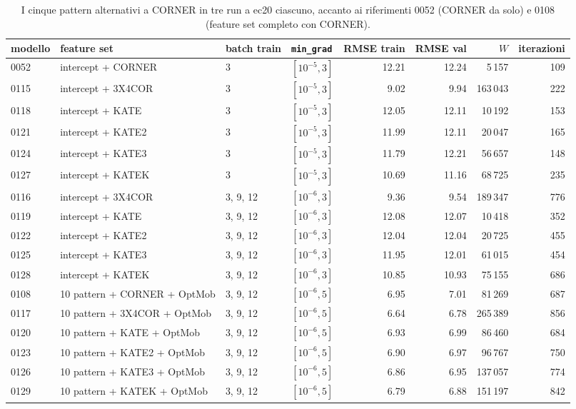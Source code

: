 \begin{table}[ht]
\centering
\small
\begin{tabular}{llllrrrr}
\toprule
modello & feature set & batch train & \texttt{min\_grad} & RMSE train & RMSE val & $W$ & iterazioni \\
\midrule
0052 & intercept + CORNER & 3 & $[10^{-5}, 3]$ & 12.21 & 12.24 & 5\,157 & 109 \\
0115 & intercept + 3X4COR & 3 & $[10^{-5}, 3]$ & 9.02 & 9.94 & 163\,043 & 222 \\
0118 & intercept + KATE & 3 & $[10^{-5}, 3]$ & 12.05 & 12.11 & 10\,192 & 153 \\
0121 & intercept + KATE2 & 3 & $[10^{-5}, 3]$ & 11.99 & 12.11 & 20\,047 & 165 \\
0124 & intercept + KATE3 & 3 & $[10^{-5}, 3]$ & 11.79 & 12.21 & 56\,657 & 148 \\
0127 & intercept + KATEK & 3 & $[10^{-5}, 3]$ & 10.69 & 11.16 & 68\,725 & 235 \\
0116 & intercept + 3X4COR & 3, 9, 12 & $[10^{-6}, 3]$ & 9.36 & 9.54 & 189\,347 & 776 \\
0119 & intercept + KATE & 3, 9, 12 & $[10^{-6}, 3]$ & 12.08 & 12.07 & 10\,418 & 352 \\
0122 & intercept + KATE2 & 3, 9, 12 & $[10^{-6}, 3]$ & 12.04 & 12.04 & 20\,725 & 455 \\
0125 & intercept + KATE3 & 3, 9, 12 & $[10^{-6}, 3]$ & 11.95 & 12.01 & 61\,015 & 454 \\
0128 & intercept + KATEK & 3, 9, 12 & $[10^{-6}, 3]$ & 10.85 & 10.93 & 75\,155 & 686 \\
0108 & 10 pattern + CORNER + OptMob & 3, 9, 12 & $[10^{-6}, 5]$ & 6.95 & 7.01 & 81\,269 & 687 \\
0117 & 10 pattern + 3X4COR + OptMob & 3, 9, 12 & $[10^{-6}, 5]$ & 6.64 & 6.78 & 265\,389 & 856 \\
0120 & 10 pattern + KATE + OptMob & 3, 9, 12 & $[10^{-6}, 5]$ & 6.93 & 6.99 & 86\,460 & 684 \\
0123 & 10 pattern + KATE2 + OptMob & 3, 9, 12 & $[10^{-6}, 5]$ & 6.90 & 6.97 & 96\,767 & 750 \\
0126 & 10 pattern + KATE3 + OptMob & 3, 9, 12 & $[10^{-6}, 5]$ & 6.86 & 6.95 & 137\,057 & 774 \\
0129 & 10 pattern + KATEK + OptMob & 3, 9, 12 & $[10^{-6}, 5]$ & 6.79 & 6.88 & 151\,197 & 842 \\
\bottomrule
\end{tabular}
\caption{I cinque pattern alternativi a CORNER in tre run a ec20
ciascuno, accanto ai riferimenti 0052 (CORNER da solo) e 0108
(feature set completo con CORNER).}
\label{tab:corner5}
\end{table}

